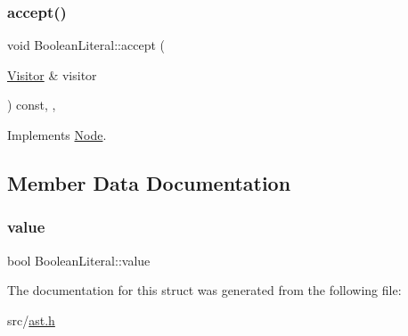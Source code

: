 \subsubsection{\texorpdfstring{accept()}{accept()}}
{\footnotesize\ttfamily void Boolean\+Literal\+::accept (\begin{DoxyParamCaption}\item[{\hyperlink{struct_visitor}{Visitor} \&}]{visitor }\end{DoxyParamCaption}) const\hspace{0.3cm}{\ttfamily [inline]}, {\ttfamily [override]}, {\ttfamily [virtual]}}



Implements \hyperlink{struct_node_a10bd7af968140bbf5fa461298a969c71}{Node}.



\subsection{Member Data Documentation}
\mbox{\label{struct_boolean_literal_a2d343f4fae4b805fc0260cc86c38d3cc}} 
\subsubsection{\texorpdfstring{value}{value}}
{\footnotesize\ttfamily bool Boolean\+Literal\+::value}



The documentation for this struct was generated from the following file\+:\begin{DoxyCompactItemize}
\item 
src/\hyperlink{ast_8h}{ast.\+h}\end{DoxyCompactItemize}

